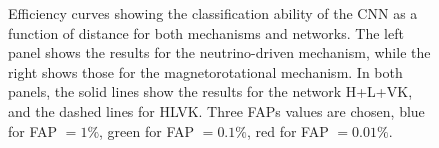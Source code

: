 \documentclass[aps,twocolumn,showpacs,groupedaddress, nofootinbib]{revtex4}  %
\begin{document}
%
%
\begin{figure}
     \begin{center}
        \quad
    \end{center}
    \caption{Efficiency curves showing the classification ability of the
\ac{CNN} as a function of distance for both mechanisms and networks.  The left
panel shows the results for the neutrino-driven mechanism, while the right
shows those for the magnetorotational mechanism. 
In both panels, the solid lines show the results for the network H+L+VK, and the dashed lines for HLVK.
Three \acp{FAP} values are chosen, blue for \ac{FAP} $=1\%$, green for \ac{FAP}
$=0.1\%$, red for \ac{FAP} $=0.01\%$.\label{fig:eff}}
\end{figure}
\end{document}
